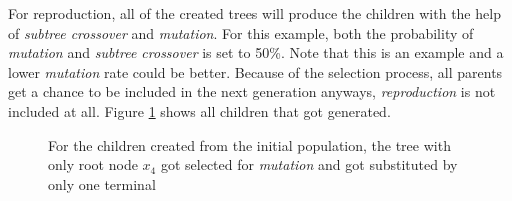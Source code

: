 \documentclass[tikz, runningheads]{llncs}
\begin{document}
For reproduction, all of the created trees will produce the children with the help of \textit{subtree crossover}
and \textit{mutation}. For this example, both the probability of \textit{mutation} and \textit{subtree crossover} is set 
to 50\%. Note that this is an example and a lower \textit{mutation} rate could be better. Because of the selection process, all parents get a
chance to be included in the next generation anyways, \textit{reproduction} is not included at all.
Figure \ref{exampleChildren} shows all children that got generated.

\begin{figure}[htbp]
	\centering
	\begin{adjustbox}{valign=t}
		\scalebox{0.8}{
		\begin{forest}
			[-
				[/
					[$x_4$]
					[$x_5$]
				]	
				[-
					[$x_3$]
					[$x_8$]
				]
			]
		\end{forest}
		}
	\end{adjustbox}\qquad
	\begin{adjustbox}{valign=t}
		\scalebox{0.5}{
		\begin{forest}
			[/
				[+
					[$x_{10}$]
					[/
						[+
							[$x_{10}$]
							[$x_8$]
						]
						[$*$
							[$x_7$]
							[$x_2$]
						]
					]
				]
				[$x_7$]
			]
		\end{forest}
		}
	\end{adjustbox}\qquad
	\begin{adjustbox}{valign=t}
		\scalebox{0.6}{
		\begin{forest}
			[+
				[/
					[-
						[$x_{12}$]
						[$x_{10}$]
					]
					[$x_{12}$]
				]
				[/
					[$3.866$]
					[-
						[$x_1$]
						[$x_{12}$]
					]
				]	
			]
		\end{forest}
		}
	\end{adjustbox}\qquad
	\begin{adjustbox}{valign=t}
		\scalebox{1}{
		\begin{forest}
			[$x_4$]
		\end{forest}
		}
	\end{adjustbox}
	\caption{For the children created from the initial population, the tree with only root node $x_4$ got selected for 
	\textit{mutation} and got substituted by only one terminal} \label{exampleChildren}
\end{figure}
\end{document}
